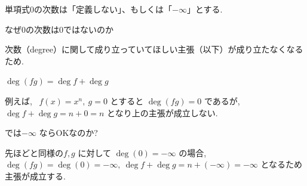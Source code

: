 \documentclass[10pt]{jsarticle}
\begin{document}
  \LARGE{単項式$0$の次数は「定義しない」、もしくは「$-\infty$」とする.}
  \bigskip

  \LARGE{なぜ$0$の次数は$0$ではないのか}

  \normalsize
  次数（degree）に関して成り立っていてほしい主張（以下）が成り立たなくなるため.

  $\deg(fg) = \deg f + \deg g$

  例えば, \ $f(x) = x^n, \ g = 0$ とすると $\deg(fg) = 0$ であるが, \\ $\deg f + \deg g = n + 0 = n$ となり上の主張が成立しない.

  \bigskip
  \bigskip

  \LARGE{では$-\infty$ ならOKなのか?}

  \normalsize
  先ほどと同様の$f, g$ に対して $\deg(0) = -\infty$ の場合, \\
  $\deg(fg) = \deg(0) = -\infty, \ \deg f + \deg g = n + (-\infty) = -\infty$ となるため主張が成立する.
  
\end{document}
